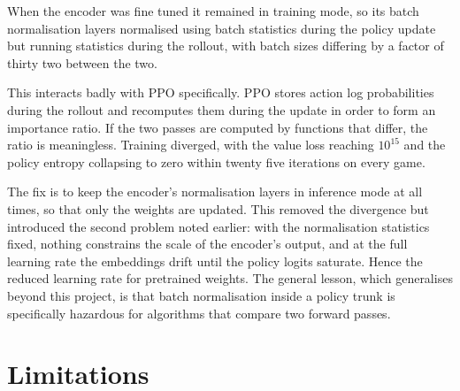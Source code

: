 \documentclass[11pt,a4paper]{article}
\begin{document}
When the encoder was fine tuned it remained in training mode, so its batch
normalisation layers normalised using batch statistics during the policy update but
running statistics during the rollout, with batch sizes differing by a factor of
thirty two between the two.

This interacts badly with PPO specifically. PPO stores action log probabilities
during the rollout and recomputes them during the update in order to form an
importance ratio. If the two passes are computed by functions that differ, the
ratio is meaningless. Training diverged, with the value loss reaching $10^{15}$ and
the policy entropy collapsing to zero within twenty five iterations on every game.

The fix is to keep the encoder's normalisation layers in inference mode at all
times, so that only the weights are updated. This removed the divergence but
introduced the second problem noted earlier: with the normalisation statistics
fixed, nothing constrains the scale of the encoder's output, and at the full
learning rate the embeddings drift until the policy logits saturate. Hence the
reduced learning rate for pretrained weights. The general lesson, which
generalises beyond this project, is that batch normalisation inside a policy trunk
is specifically hazardous for algorithms that compare two forward passes.

\section{Limitations}
\label{sec:limitations}
\end{document}
